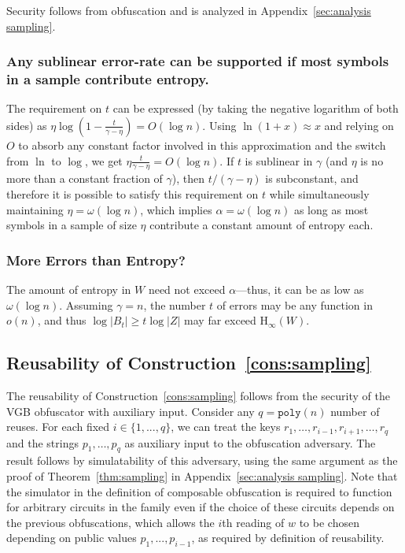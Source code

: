 \documentclass[11pt]{article}
\renewcommand{\paragraph}[1]{\subsubsection{#1}}
\newcommand{\apref}[1]{\mbox{Appendix~\ref{#1}}}
\newcommand{\consref}[1]{\mbox{Construction~\ref{#1}}}
\newcommand{\poly}{\ensuremath{\mathtt{poly}}\xspace}
\newcommand{\Hoo}{\mathrm{H}_\infty}
\newcommand{\subsetEntropy}{\alpha}
\begin{document}
Security follows from obfuscation and is analyzed in \apref{sec:analysis sampling}.
 
\paragraph{Any sublinear error-rate can be supported if most symbols in a sample contribute entropy.}
The requirement on $t$ can be expressed (by taking the negative logarithm of both sides) as $\eta \log  \left(1-\frac{t }{\gamma-\eta}\right) = O (\log n)$. Using $\ln (1+x)\approx x$ and relying on $O$ to absorb any 
constant factor involved in this approximation and the switch from $\ln$ to $\log$, we get $\eta \frac{t }{\gamma-\eta} = O(\log n)$. If $t$ is sublinear in $\gamma$
 (and $\eta$ is no more than a constant fraction of $\gamma$), then $t/(\gamma-\eta)$ is subconstant, and therefore it is possible to satisfy this requirement on $t$ while simultaneously maintaining $\eta = \omega (\log n)$, which implies $\subsetEntropy = \omega(\log n)$ as long as most symbols in a sample of size $\eta$ contribute a constant amount of entropy each.
 
\paragraph{More Errors than Entropy?}
The amount of entropy in $W$ need not exceed $\subsetEntropy$---thus, it can be as low as $\omega(\log n)$. Assuming $\gamma = n$, the number $t$ of errors may be any function in $o(n)$, and thus $\log |B_t| \ge t \log |Z|$ may far exceed $\Hoo(W)$.


\subsection{Reusability of \consref{cons:sampling}}
The reusability of \consref{cons:sampling} follows from the security of the VGB obfuscator with auxiliary input. Consider any $q = \poly(n)$ number of reuses.  For each fixed $i\in \{1,..., q\}$, we can treat the keys $r_1,\dots, r_{i-1}, r_{i+1}, \dots, r_q$ and the strings $p_1, \dots, p_q$ as auxiliary input to the obfuscation adversary. The result follows by simulatability of this adversary, using the same argument as the proof of Theorem~\ref{thm:sampling} in \apref{sec:analysis sampling}. Note that the simulator in the definition of composable obfuscation is required to function for arbitrary circuits in the family even if the choice of these circuits depends on the previous obfuscations, which allows the $i$th reading of $w$ to be chosen depending on public values $p_1,..., p_{i-1}$, as required by definition of reusability.
\end{document}
